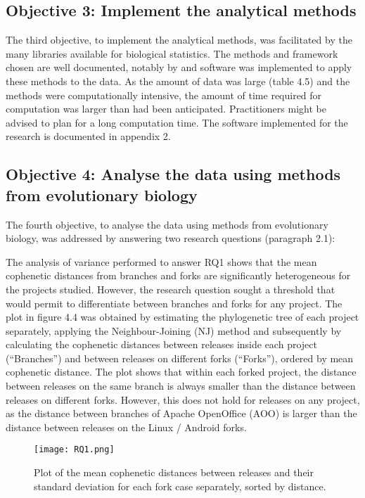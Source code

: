 \subsection{Objective 3: Implement the analytical methods}
The third objective, to implement the analytical methods, was facilitated by the many libraries available for biological statistics. The methods and framework chosen are well documented, notably by \citet{Paradis2011} and software was implemented to apply these methods to the data. As the amount of data was large (table 4.5) and the methods were computationally intensive, the amount of time required for computation was larger than had been anticipated. Practitioners might be advised to plan for a long computation time. The software implemented for the research is documented in appendix 2.

\subsection{Objective 4: Analyse the data using methods from evolutionary biology}
The fourth objective, to analyse the data using methods from evolutionary biology, was addressed by answering two research questions (paragraph 2.1):

The analysis of variance performed to answer RQ1 shows that the mean cophenetic distances from branches and forks are significantly heterogeneous for the projects studied. However, the research question sought a threshold that would permit to differentiate between branches and forks for any project. The plot in figure 4.4 was obtained by estimating the phylogenetic tree of each project separately, applying the Neighbour-Joining (NJ) method and subsequently by calculating the cophenetic distances between releases inside each project (“Branches”) and between releases on different forks (“Forks”), ordered by mean cophenetic distance. The plot shows that within each forked project, the distance between releases on the same branch is always smaller than the distance between releases on different forks. However, this does not hold for releases on any project, as the distance between branches of Apache OpenOffice (AOO) is larger than the distance between releases on the Linux / Android forks.

\begin{figure}[H]
  \texttt{[image: RQ1.png]}
  \caption{Plot of the mean cophenetic distances between releases and their standard deviation for each fork case separately, sorted by distance.}
  \label{fig:rq1}
\end{figure}



